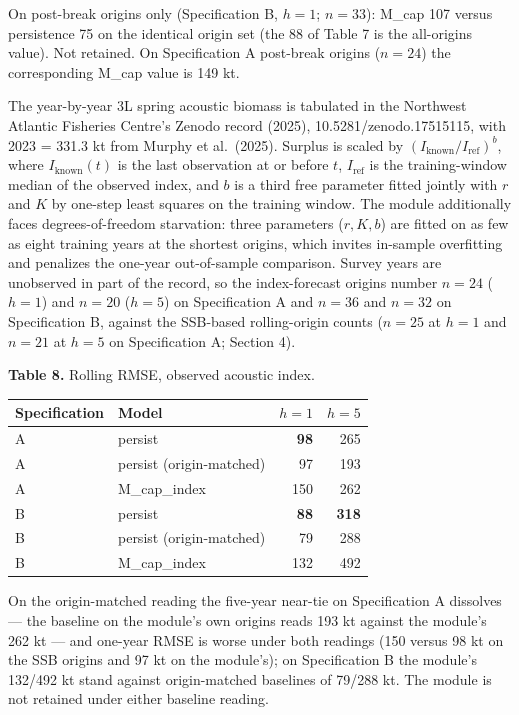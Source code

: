 \documentclass[11pt]{article}
\begin{document}
On post-break origins only (Specification B, \(h=1\); \(n=33\)): M\_cap
107 versus persistence 75 on the identical origin set (the 88 of Table 7
is the all-origins value). Not retained. On Specification A post-break
origins (\(n=24\)) the corresponding M\_cap value is 149 kt.

The year-by-year 3L spring acoustic biomass is tabulated in the
Northwest Atlantic Fisheries Centre's Zenodo record (2025),
10.5281/zenodo.17515115, with 2023 = 331.3 kt from Murphy et al.~(2025).
Surplus is scaled by \((I_{\mathrm{known}}/I_{\mathrm{ref}})^{b}\),
where \(I_{\mathrm{known}}(t)\) is the last observation at or before
\(t\), \(I_{\mathrm{ref}}\) is the training-window median of the
observed index, and \(b\) is a third free parameter fitted jointly with
\(r\) and \(K\) by one-step least squares on the training window. The
module additionally faces degrees-of-freedom starvation: three
parameters (\(r, K, b\)) are fitted on as few as eight training years at
the shortest origins, which invites in-sample overfitting and penalizes
the one-year out-of-sample comparison. Survey years are unobserved in
part of the record, so the index-forecast origins number \(n=24\)
(\(h=1\)) and \(n=20\) (\(h=5\)) on Specification A and \(n=36\) and
\(n=32\) on Specification B, against the SSB-based rolling-origin counts
(\(n=25\) at \(h=1\) and \(n=21\) at \(h=5\) on Specification A; Section
4).

\textbf{Table 8.} Rolling RMSE, observed acoustic index.

\begin{longtable}[]{@{}llrr@{}}
\toprule\noalign{}
Specification & Model & \(h=1\) & \(h=5\) \\
\midrule\noalign{}
\endhead
\bottomrule\noalign{}
\endlastfoot
A & persist & \textbf{98} & 265 \\
A & persist (origin-matched) & 97 & 193 \\
A & M\_cap\_index & 150 & 262 \\
B & persist & \textbf{88} & \textbf{318} \\
B & persist (origin-matched) & 79 & 288 \\
B & M\_cap\_index & 132 & 492 \\
\end{longtable}

On the origin-matched reading the five-year near-tie on Specification A
dissolves --- the baseline on the module's own origins reads 193 kt
against the module's 262 kt --- and one-year RMSE is worse under both
readings (150 versus 98 kt on the SSB origins and 97 kt on the
module's); on Specification B the module's 132/492 kt stand against
origin-matched baselines of 79/288 kt. The module is not retained under
either baseline reading.
\end{document}

